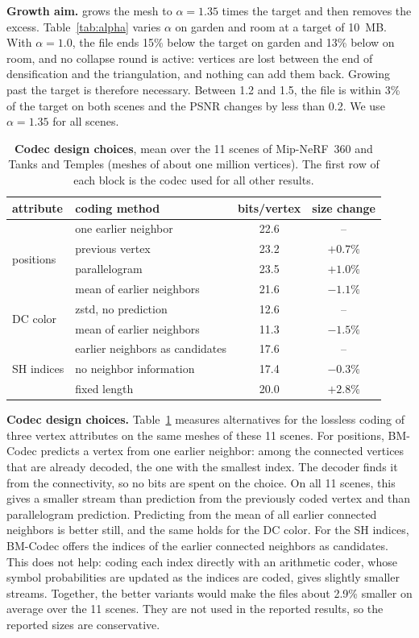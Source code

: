 \noindent\textbf{Growth aim.} \BM grows the mesh to $\alpha = 1.35$ times the target and then removes the excess. Table~\ref{tab:alpha} varies $\alpha$ on garden and room at a target of 10~MB. With $\alpha = 1.0$, the file ends 15\% below the target on garden and 13\% below on room, and no collapse round is active: vertices are lost between the end of densification and the triangulation, and nothing can add them back. Growing past the target is therefore necessary. Between 1.2 and 1.5, the file is within 3\% of the target on both scenes and the PSNR changes by less than 0.2\dB. We use $\alpha = 1.35$ for all scenes.

\begin{table}[t]\centering\footnotesize
\caption{\textbf{Codec design choices}, mean over the 11 scenes of Mip-NeRF~360 and Tanks and Temples (meshes of about one million vertices). The first row of each block is the codec used for all other results.}
\label{tab:codec-abl}
\setlength{\tabcolsep}{4pt}
\begin{tabular}{@{}llcc@{}}
\toprule
attribute & coding method & bits/vertex & size change \\
\midrule
\multirow{4}{*}{positions} & one earlier neighbor & 22.6 & -- \\
 & previous vertex & 23.2 & $+0.7\%$ \\
 & parallelogram & 23.5 & $+1.0\%$ \\
 & mean of earlier neighbors & 21.6 & $-1.1\%$ \\
\midrule
\multirow{2}{*}{DC color} & zstd, no prediction & 12.6 & -- \\
 & mean of earlier neighbors & 11.3 & $-1.5\%$ \\
\midrule
\multirow{3}{*}{SH indices} & earlier neighbors as candidates & 17.6 & -- \\
 & no neighbor information & 17.4 & $-0.3\%$ \\
 & fixed length & 20.0 & $+2.8\%$ \\
\bottomrule
\end{tabular}
\end{table}

\noindent\textbf{Codec design choices.} Table~\ref{tab:codec-abl} measures alternatives for the lossless coding of three vertex attributes on the same meshes of these 11 scenes. For positions, BM-Codec predicts a vertex from one earlier neighbor: among the connected vertices that are already decoded, the one with the smallest index. The decoder finds it from the connectivity, so no bits are spent on the choice. On all 11 scenes, this gives a smaller stream than prediction from the previously coded vertex and than parallelogram prediction. Predicting from the mean of all earlier connected neighbors is better still, and the same holds for the DC color. For the SH indices, BM-Codec offers the indices of the earlier connected neighbors as candidates. This does not help: coding each index directly with an arithmetic coder, whose symbol probabilities are updated as the indices are coded, gives slightly smaller streams. Together, the better variants would make the files about 2.9\% smaller on average over the 11 scenes. They are not used in the reported results, so the reported sizes are conservative.
